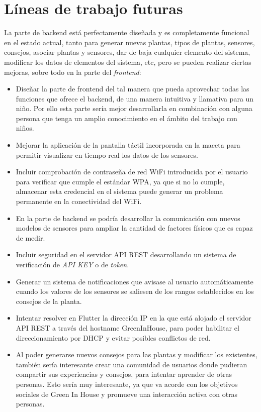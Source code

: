 \section{Líneas de trabajo futuras}
La parte de backend está perfectamente diseñada y es completamente funcional en el estado actual, tanto para generar nuevas plantas, tipos de plantas, sensores, consejos, asociar plantas y sensores, dar de baja cualquier elemento del sistema, modificar los datos de elementos del sistema, etc, pero se pueden realizar ciertas mejoras, sobre todo en la parte del \textit{frontend}:
\begin{itemize}
    \item Diseñar la parte de frontend del tal manera que pueda aprovechar todas las funciones que ofrece el backend, de una manera intuitiva y llamativa para un niño. Por ello esta parte sería mejor desarrollarla en combinación con alguna persona que tenga un amplio conocimiento en el ámbito del trabajo con niños. 
    \item Mejorar la aplicación de la pantalla táctil incorporada en la maceta para permitir visualizar en tiempo real los datos de los sensores.
    \item Incluir comprobación de contraseña de red WiFi introducida por el usuario para verificar que cumple el estándar WPA, ya que si no lo cumple, almacenar esta credencial en el sistema puede generar un problema permanente en la conectividad del WiFi.
    \item En la parte de backend se podría desarrollar la comunicación con nuevos modelos de sensores para ampliar la cantidad de factores físicos que es capaz de medir.
    \item Incluir seguridad en el servidor API REST desarrollando un sistema de verificación de \textit{API KEY} o de \textit{token}.
    \item Generar un sistema de notificaciones que avisase al usuario automáticamente cuando los valores de los sensores se saliesen de los rangos establecidos en los consejos de la planta.
    \item Intentar resolver en Flutter la dirección IP en la que está alojado el servidor API REST a través del hostname GreenInHouse, para poder habilitar el direccionamiento por DHCP y evitar posibles conflictos de red.
    \item Al poder generarse nuevos consejos para las plantas y modificar los existentes, también sería interesante crear una comunidad de usuarios donde pudieran compartir sus experiencias y consejos, para intentar aprender de otras personas. Esto sería muy interesante, ya que va acorde con los objetivos sociales de Green In House y promueve una interacción activa con otras personas.

\end{itemize}
